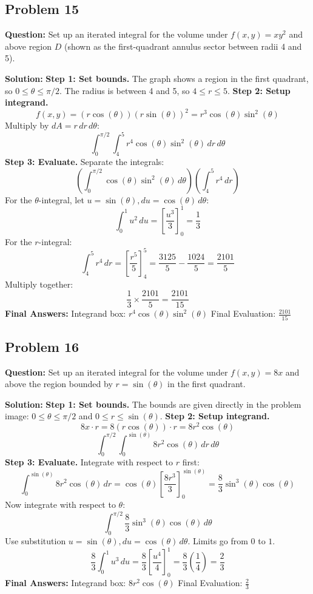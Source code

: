 \documentclass[12pt]{article}
\begin{document}
\subsection*{Problem 15}
\textbf{Question:} Set up an iterated integral for the volume under $f(x,y) = xy^2$ and above region $D$ (shown as the first-quadrant annulus sector between radii 4 and 5).

\textbf{Solution:}
\textbf{Step 1: Set bounds.}
The graph shows a region in the first quadrant, so $0 \le \theta \le \pi/2$. 
The radius is between 4 and 5, so $4 \le r \le 5$.
\textbf{Step 2: Setup integrand.}
\[ f(x,y) = (r\cos(\theta))(r\sin(\theta))^2 = r^3\cos(\theta)\sin^2(\theta) \]
Multiply by $dA = r \, dr \, d\theta$:
\[ \int_0^{\pi/2} \int_4^5 r^4\cos(\theta)\sin^2(\theta) \, dr \, d\theta \]
\textbf{Step 3: Evaluate.}
Separate the integrals:
\[ \left( \int_0^{\pi/2} \cos(\theta)\sin^2(\theta) \, d\theta \right) \left( \int_4^5 r^4 \, dr \right) \]
For the $\theta$-integral, let $u = \sin(\theta), du = \cos(\theta) \, d\theta$:
\[ \int_0^1 u^2 \, du = \left[ \frac{u^3}{3} \right]_0^1 = \frac{1}{3} \]
For the $r$-integral:
\[ \int_4^5 r^4 \, dr = \left[ \frac{r^5}{5} \right]_4^5 = \frac{3125}{5} - \frac{1024}{5} = \frac{2101}{5} \]
Multiply together:
\[ \frac{1}{3} \times \frac{2101}{5} = \frac{2101}{15} \]
\textbf{Final Answers:}
Integrand box: $r^4\cos(\theta)\sin^2(\theta)$
Final Evaluation: $\frac{2101}{15}$

\subsection*{Problem 16}
\textbf{Question:} Set up an iterated integral for the volume under $f(x,y) = 8x$ and above the region bounded by $r = \sin(\theta)$ in the first quadrant.

\textbf{Solution:}
\textbf{Step 1: Set bounds.}
The bounds are given directly in the problem image: $0 \le \theta \le \pi/2$ and $0 \le r \le \sin(\theta)$.
\textbf{Step 2: Setup integrand.}
\[ 8x \cdot r = 8(r\cos(\theta)) \cdot r = 8r^2\cos(\theta) \]
\[ \int_0^{\pi/2} \int_0^{\sin(\theta)} 8r^2\cos(\theta) \, dr \, d\theta \]
\textbf{Step 3: Evaluate.}
Integrate with respect to $r$ first:
\[ \int_0^{\sin(\theta)} 8r^2\cos(\theta) \, dr = \cos(\theta) \left[ \frac{8r^3}{3} \right]_0^{\sin(\theta)} = \frac{8}{3}\sin^3(\theta)\cos(\theta) \]
Now integrate with respect to $\theta$:
\[ \int_0^{\pi/2} \frac{8}{3}\sin^3(\theta)\cos(\theta) \, d\theta \]
Use substitution $u = \sin(\theta), du = \cos(\theta) \, d\theta$. Limits go from $0$ to $1$.
\[ \frac{8}{3} \int_0^1 u^3 \, du = \frac{8}{3} \left[ \frac{u^4}{4} \right]_0^1 = \frac{8}{3} \left( \frac{1}{4} \right) = \frac{2}{3} \]
\textbf{Final Answers:}
Integrand box: $8r^2\cos(\theta)$
Final Evaluation: $\frac{2}{3}$
\end{document}
